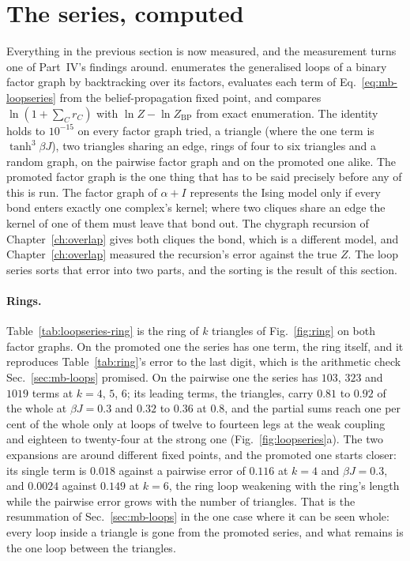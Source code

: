 \section{The series, computed}
\label{sec:mb-computed}

Everything in the previous section is now measured, and the measurement
turns one of Part~IV's findings around.
 enumerates the generalised loops of a
binary factor graph by backtracking over its factors, evaluates each term
of Eq.~\eqref{eq:mb-loopseries} from the belief-propagation fixed point,
and compares $\ln(1+\sum_{C}r_{C})$ with $\ln Z-\ln Z_{\mathrm{BP}}$ from
exact enumeration. The identity holds to $10^{-15}$ on every factor graph
tried, a triangle (where the one term is $\tanh^{3}\beta J$), two
triangles sharing an edge, rings of four to six triangles and a random
graph, on the pairwise factor graph and on the promoted one alike. The
promoted factor graph is the one thing that has to be said precisely
before any of this is run. The factor graph of $\alpha+I$ represents the
Ising model only if every bond enters exactly one complex's kernel; where
two cliques share an edge the kernel of one of them must leave that bond
out. The chygraph recursion of Chapter~\ref{ch:overlap} gives both cliques
the bond, which is a different model, and Chapter~\ref{ch:overlap} measured
the recursion's error against the true $Z$. The loop series sorts that
error into two parts, and the sorting is the result of this section.

\paragraph{Rings.} Table~\ref{tab:loopseries-ring} is the ring of $k$
triangles of Fig.~\ref{fig:ring} on both factor graphs. On the promoted one
the series has one term, the ring itself, and it reproduces
Table~\ref{tab:ring}'s error to the last digit, which is the arithmetic
check Sec.~\ref{sec:mb-loops} promised. On the pairwise one the series has
$103$, $323$ and $1019$ terms at $k=4$, $5$, $6$; its leading terms, the
triangles, carry $0.81$ to $0.92$ of the whole at $\beta J=0.3$ and $0.32$
to $0.36$ at $0.8$, and the partial sums reach one per cent of the whole
only at loops of twelve to fourteen legs at the weak coupling and eighteen
to twenty-four at the strong one (Fig.~\ref{fig:loopseries}a). The two
expansions are around different fixed points, and the promoted one starts
closer: its single term is $0.018$ against a pairwise error of $0.116$ at
$k=4$ and $\beta J=0.3$, and $0.0024$ against $0.149$ at $k=6$, the ring
loop weakening with the ring's length while the pairwise error grows with
the number of triangles. That is the resummation of
Sec.~\ref{sec:mb-loops} in the one case where it can be seen whole: every
loop inside a triangle is gone from the promoted series, and what remains
is the one loop between the triangles.

